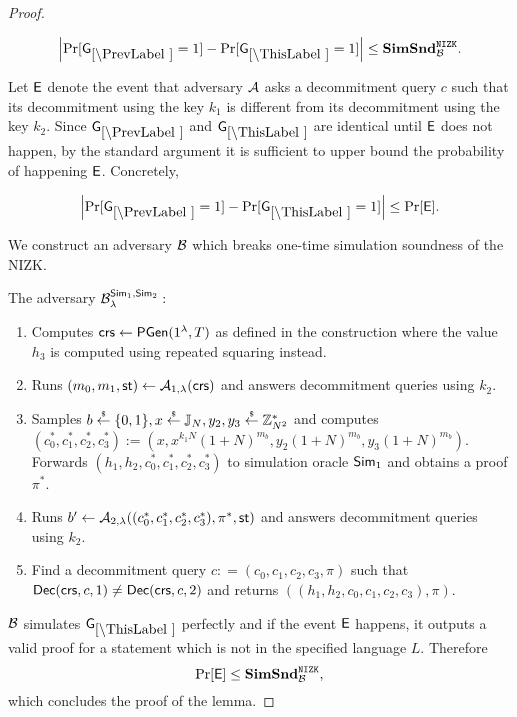 \begin{proof}
\begin{lemma}
\[
\left|\Pr[\games_\prevgame = 1] - \Pr[\games_\thisgame = 1]\right| \leq \simsnd^\nizk_\advB. 
\]
\end{lemma}

Let $\mathsf{E}$ denote the event that adversary $\mathcal{A}$ asks a decommitment query $c$ such that its decommitment using the key $k_1$ is different from its decommitment using the key $k_2$. Since $\games_\prevgame$ and $\games_\thisgame$ are identical until $\mathsf{E}$ does not happen, by the standard argument it is sufficient to upper bound the probability of happening $\mathsf{E}$. Concretely,  

\[
\left|\Pr[\games_\prevgame = 1] - \Pr[\games_\thisgame = 1]\right| \leq \Pr[\event]. 
\]

We construct an adversary $\mathcal{B}$ which breaks one-time simulation soundness of the NIZK. 

The adversary $\mathcal{B}_{\lambda}^{\mathsf{Sim}_1, \mathsf{Sim}_2}:$
\vspace{-2mm}
\begin{enumerate}
\item Computes $\mathsf{crs} \leftarrow \mathsf{PGen}(1{^{\lambda}}, T)$ as defined in the construction where the value $h_3$ is computed using repeated squaring instead.
\item Runs $(m_0, m_1, \mathsf{st}) \leftarrow \mathcal{A}_{1, \lambda}(\mathsf{crs})$ and answers decommitment queries using $k_2$.
\item Samples $b \stackrel{{\scriptscriptstyle\$}}{\leftarrow} \{0,1\}, x \stackrel{{\scriptscriptstyle\$}}{\leftarrow} \mathbb{J}_N, y_2, y_3 \stackrel{{\scriptscriptstyle\$}}{\leftarrow} \mathbb{Z}_{N^2}^*$ and computes $(c_0^*, c_1^*, c_2^*, c_3^*):=(x, x^{k_1 N} (1+N)^{m_b}, y_2 (1+N)^{m_b}, y_3 (1+N)^{m_b})$. Forwards $(h_1, h_2, c_0^*, c_1^*, c_2^*, c_3^*)$ to simulation oracle $\mathsf{Sim}_1$ and obtains a proof $\pi^*$.
\item Runs $b' \leftarrow \mathcal{A}_{2, \lambda}((c_0^*, c_1^*, c_2^*, c_3^*), \pi^*, \mathsf{st})$ and answers decommitment queries using $k_2$.
\item Find a decommitment query $c: = (c_0, c_1, c_2, c_3, \pi)$ such that $\mathsf{Dec}(\mathsf{crs}, c, 1) \neq \mathsf{Dec}(\mathsf{crs},c,2)$ and returns $((h_1, h_2, c_0, c_1, c_2, c_3), \pi)$.
\end{enumerate}

$\mathcal{B}$ simulates $\games_\thisgame$ perfectly and if the event $\mathsf{E}$ happens, it outputs a valid proof for a statement which is not in the specified language $L$. Therefore
\[\Pr[\mathsf{E}] \leq \mathbf{SimSnd}^{\mathtt{NIZK}}_{\mathcal{B}},\]
which concludes the proof of the lemma.  

%
%
%


\end{proof}
